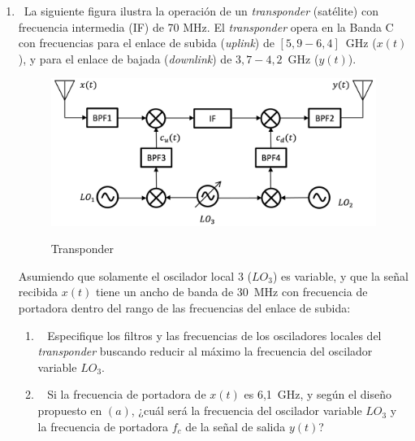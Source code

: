 \begin{enumerate}
\item~La siguiente figura ilustra la operación de un \textit{transponder} (satélite) con frecuencia intermedia (IF) de 70 MHz. El \textit{transponder} opera en la Banda C con frecuencias para el enlace de subida (\textit{uplink}) de $[5,9 - 6,4]$~GHz ($x(t)$), y para el enlace de bajada (\textit{downlink}) de $3,7 - 4,2$~GHz ($y(t)$).

\vspace{200px}
\begin{figure}[h!]
	\captionsetup{justification = raggedright, singlelinecheck = false}
	\caption{Transponder} 
	\centering
	\includegraphics[scale=0.25]{Imagenes/fig4sup.png}
	\label{fig:fig4sup}
\end{figure}


Asumiendo que solamente el oscilador local 3 ($LO_3$) es variable, y que la señal recibida $x(t)$ tiene un ancho de banda de $30$~MHz con frecuencia de portadora dentro del rango de las frecuencias del enlace de subida:

\begin{enumerate}
	\item~ Especifique los filtros y las frecuencias de los osciladores locales del \textit{transponder} buscando reducir al máximo la frecuencia del oscilador variable $LO_3$.
	\begin{table}[h]
	\captionsetup{justification = raggedright,singlelinecheck = false}
	\caption{Ejercicio nueve.}
	\label{tabla:tabla15}
		\centering
\end{table}
	\item~ Si la frecuencia de portadora de $x(t)$ es 6,1~GHz, y según el diseño propuesto en $(a)$, ¿cuál será la frecuencia del oscilador variable $LO_3$ y la frecuencia de portadora $f_c$ de la señal de salida $y(t)$?\\
	

\end{enumerate}
\end{enumerate}

